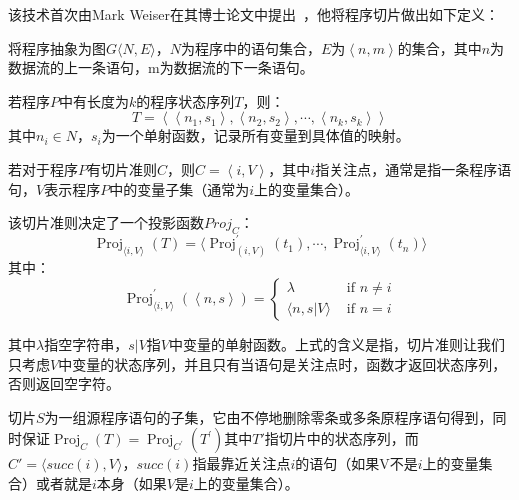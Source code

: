 该技术首次由Mark Weiser在其博士论文中提出~\cite{slices:weiser1979}，他将程序切片做出如下定义：

将程序抽象为图$G\langle N,E\rangle$，$N$为程序中的语句集合，$E$为$\left\langle n,m \right\rangle$的集合，其中$n$为数据流的上一条语句，m为数据流的下一条语句。

\begin{definition}
    
    若程序$P$中有长度为$k$的程序状态序列$T$，则：
    $$T=\left\langle \left\langle n_{1},s_{1} \right\rangle, \left\langle n_{2},s_{2} \right\rangle , \cdots , \left\langle n_{k},s_{k} \right\rangle \right\rangle$$
    其中$n_{i} \in N$，$s_i$为一个单射函数，记录所有变量到具体值的映射。
\end{definition}

\begin{definition}
    
    若对于程序$P$有切片准则$C$，则$C=\left\langle i, V \right\rangle$，其中$i$指关注点，通常是指一条程序语句，$V$表示程序$P$中的变量子集（通常为$i$上的变量集合）。
    
\end{definition}

该切片准则决定了一个投影函数$Proj_C$：
$$
\operatorname{Proj}_{\langle i, V\rangle}(T)=\langle\operatorname{Proj}_{(i, V)}^{\prime}\left(t_{1}\right) , \cdots, \operatorname{Proj}_{\langle i, V\rangle}^{\prime}\left(t_{n}\right) \rangle
$$
其中：
$$
\operatorname{Proj}_{\langle i, V\rangle}^{\prime}(\left\langle n, s \right\rangle)=\begin{cases}
{\lambda} & {\text { if } n \neq i} \\
{\langle n, s | V \rangle} & {\text { if } n=i}
\end{cases}
$$


其中$\lambda$指空字符串，$s|V$指$V$中变量的单射函数。上式的含义是指，切片准则让我们只考虑$V$中变量的状态序列，并且只有当语句是关注点时，函数才返回状态序列，否则返回空字符。

\begin{definition}[程序切片]
    
    切片$S$为一组源程序语句的子集，它由不停地删除零条或多条原程序语句得到，同时保证$\operatorname{Proj}_{C}(T)=\operatorname{Proj}_{C^{\prime}}\left(T^{\prime}\right)$其中$T'$指切片中的状态序列，而$C'=\langle succ(i), V \rangle$，$succ(i)$指最靠近关注点$i$的语句（如果V不是$i$上的变量集合）或者就是$i$本身（如果$ V $是$i$上的变量集合）。
    
\end{definition}

